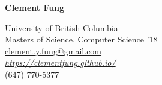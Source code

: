 \documentclass[10pt]{res} %
\begin{document}

{\huge \bf Clement Fung} \hfill 

University of British Columbia \\
Masters of Science, Computer Science '18 \\
\href{mailto:clement.y.fung@gmail.com}{\underline{clement.y.fung@gmail.com}} \\ 
\href{https://clementfung.github.io/}
{\emph{https://clementfung.github.io/}}
\\
(647) 770-5377 
\end{document}
